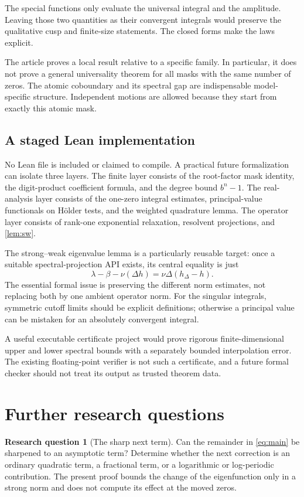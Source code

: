 \documentclass[11pt,a4paper]{article}
\numberwithin{equation}{section}
\theoremstyle{definition}
\newtheorem{question}{Research question}
\theoremstyle{remark}
\begin{document}
The special functions only evaluate the universal integral and the
amplitude. Leaving those two quantities as their convergent integrals
would preserve the qualitative cusp and finite-size statements. The
closed forms make the laws explicit.

The article proves a local result relative to a specific family. In
particular, it does not prove a general universality theorem for all
masks with the same number of zeros. The atomic coboundary and its
spectral gap are indispensable model-specific structure. Independent
motions are allowed because they start from exactly this atomic mask.

\subsection{A staged Lean implementation}
No Lean file is included or claimed to compile. A practical future
formalization can isolate three layers. The finite layer consists of
the root-factor mask identity, the digit-product coefficient formula,
and the degree bound $b^n-1$. The real-analysis layer consists of the
one-zero integral estimates, principal-value functionals on H\"older
tests, and the weighted quadrature lemma. The operator layer consists
of rank-one exponential relaxation, resolvent projections, and
\cref{lem:sw}.

The strong--weak eigenvalue lemma is a particularly reusable target:
once a suitable spectral-projection API exists, its central equality
is just
\[
 \lambda-\beta-\nu(\Delta h)=\nu\Delta(h_\Delta-h).
\]
The essential formal issue is preserving the different norm estimates,
not replacing both by one ambient operator norm. For the singular
integrals, symmetric cutoff limits should be explicit definitions;
otherwise a principal value can be mistaken for an absolutely
convergent integral.

A useful executable certificate project would prove rigorous
finite-dimensional upper and lower spectral bounds with a separately
bounded interpolation error. The existing floating-point verifier is
not such a certificate, and a future formal checker should not treat
its output as trusted theorem data.

\section{Further research questions}
\label{sec:questions}

\begin{question}[The sharp next term]
Can the remainder in \cref{eq:main} be sharpened to an asymptotic term?
Determine whether the next correction is an ordinary quadratic term,
a fractional term, or a logarithmic or log-periodic contribution.
The present proof bounds the change of the eigenfunction only in a
strong norm and does not compute its effect at the moved zeros.
\end{question}
\end{document}
